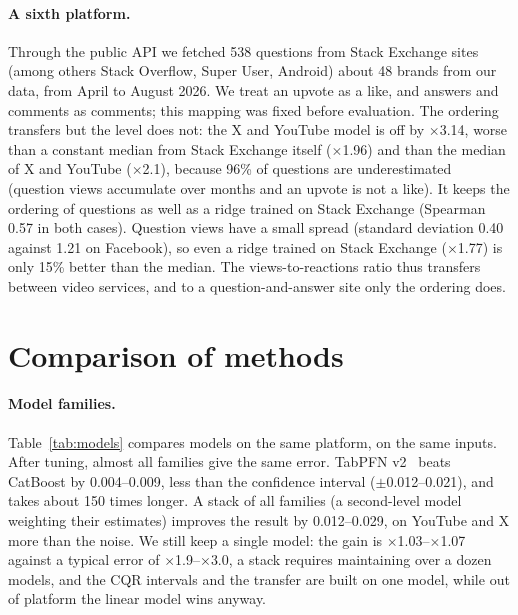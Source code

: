 \documentclass[10pt,a4paper]{article}
\newcommand{\x}[1]{$\times$#1}
\begin{document}
\paragraph{A sixth platform.} Through the public API we fetched 538 questions from Stack Exchange sites (among others
Stack Overflow, Super User, Android) about 48 brands from our data, from April to August 2026. We treat an upvote as a
like, and answers and comments as comments; this mapping was fixed before evaluation. The ordering transfers but the
level does not: the X and YouTube model is off by \x{3.14}, worse than a constant median from Stack Exchange itself
(\x{1.96}) and than the median of X and YouTube (\x{2.1}), because 96\% of questions are underestimated (question views
accumulate over months and an upvote is not a like). It keeps the ordering of questions as well as a ridge trained on
Stack Exchange (Spearman 0.57 in both cases). Question views have a small spread (standard deviation 0.40 against 1.21
on Facebook), so even a ridge trained on Stack Exchange (\x{1.77}) is only 15\% better than the median. The views-to-reactions ratio thus transfers between video services, and to a question-and-answer site only the ordering does.

\section{Comparison of methods}\label{sec:nie}

\paragraph{Model families.} Table~\ref{tab:models} compares models on the same platform, on the same inputs. After
tuning, almost all families give the same error. TabPFN v2~\cite{tabpfn} beats CatBoost by 0.004--0.009, less than the
confidence interval ($\pm$0.012--0.021), and takes about 150 times longer. A stack of all families (a second-level model
weighting their estimates) improves the result by 0.012--0.029, on YouTube and X more than the noise. We still keep a
single model: the gain is \x{1.03}--\x{1.07} against a typical error of \x{1.9}--\x{3.0}, a stack requires maintaining
over a dozen models, and the CQR intervals and the transfer are built on one model, while out of platform the linear
model wins anyway.
\end{document}
